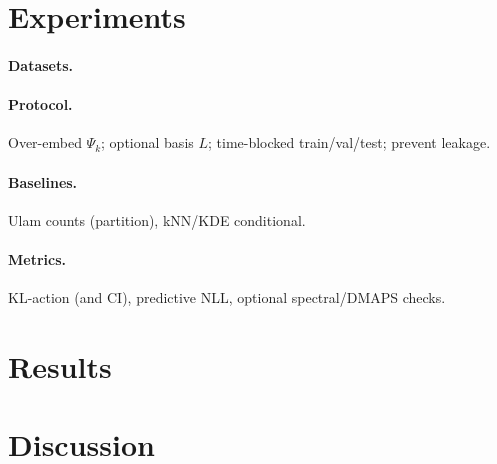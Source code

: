 \documentclass[11pt]{article}
\begin{document}
\section{Experiments}
\label{sec:expts}

\paragraph{Datasets.}

\paragraph{Protocol.}
Over-embed $\Psi_k$; optional basis $L$; time-blocked train/val/test; prevent leakage.

\paragraph{Baselines.}
Ulam counts (partition), kNN/KDE conditional.

\paragraph{Metrics.}
KL-action (and CI), predictive NLL, optional spectral/DMAPS checks.

\section{Results}
\label{sec:results}

\section{Discussion}
\end{document}
